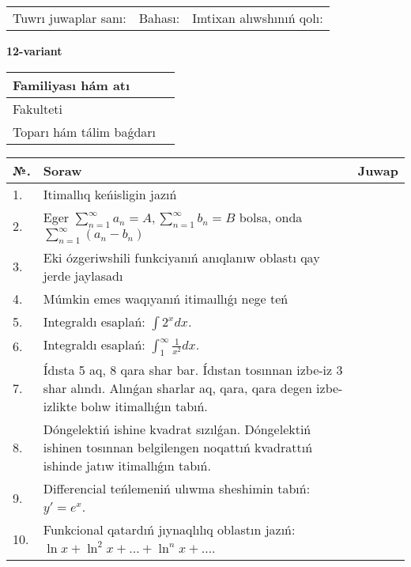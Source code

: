 \documentclass{article}
\begin{document}
\vspace{1cm}

\begin{tabular}{ c c c }
Tuwrı juwaplar sanı: \underline{\hspace{2cm}} & Bahası: \underline{\hspace{2cm}} & Imtixan alıwshınıń qolı: \underline{\hspace{2cm}} \\
\end{tabular}

\newpage

\begin{center}\textbf{12-variant}\end{center}

\bgroup
\def\arraystretch{1.5}
\begin{tabular}{ |m{6cm}|m{10cm}| }
  \hline
  Familiyası hám atı & \\
  \hline
  Fakulteti &\\
  \hline
  Toparı hám tálim baǵdarı & \\
  \hline
\end{tabular}
\egroup

\vspace{0.5cm}

\bgroup
\def\arraystretch{2}
\begin{tabular}{ |l|m{8cm}|m{7cm}| }
  \hline
  №. & Soraw & Juwap \\
  \hline
  1. & Itimallıq keńisligin jazıń &  \\
  \hline
  2. & Eger $\displaystyle\sum_{n = 1}^{\infty}a_{n} = A, \sum_{n = 1}^{\infty}b_{n} = B$ bolsa, onda $\displaystyle\sum_{n = 1}^{\infty}\left( a_{n} - b_{n} \right)$ &  \\
  \hline
  3. & Eki ózgeriwshili funkciyanıń anıqlanıw oblastı qay jerde jaylasadı &  \\
  \hline
  4. & Múmkin emes waqıyanıń itimaıllıǵı nege teń &  \\
  \hline
  5. & Integraldı esaplań: $\displaystyle\int {2^{x}dx} $. &  \\
  \hline
  6. & Integraldı esaplań: $\displaystyle\int_{1}^{\infty}{\frac{1}{x^{2}}dx}$. &  \\
  \hline
  7. & Ídısta 5 aq, 8 qara shar bar. Ídıstan tosınnan izbe-iz 3 shar alındı. Alınǵan sharlar aq, qara, qara degen izbe-izlikte bolıw itimallıǵın tabıń. &  \\
  \hline
  8. & Dóngelektiń ishine kvadrat sızılǵan. Dóngelektiń ishinen tosınnan belgilengen noqattıń kvadrattıń ishinde jatıw itimallıǵın tabıń. &  \\
  \hline
  9. & Differencial teńlemeniń ulıwma sheshimin tabıń: $y'=e^{x}$. &  \\
  \hline
  10. & Funkcional qatardıń jıynaqlılıq oblastın jazıń: $\ln x + \ln^{2}x + \ldots + \ln^{n}x + \ldots$. &  \\
  \hline
\end{tabular}
\egroup
\end{document}
